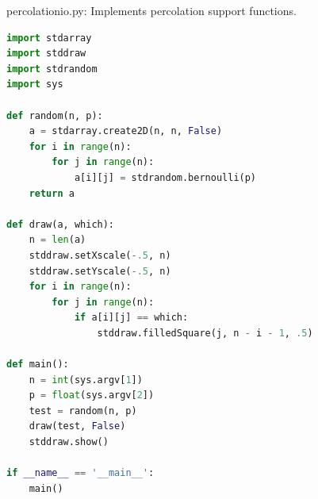 \documentclass[8pt,a4paper,compress,handout]{beamer}
\begin{document}
\begin{frame}[fragile]
\begin{framed}
\tiny percolationio.py: Implements percolation support functions.
\end{framed}

\begin{lstlisting}[language=Python]
import stdarray
import stddraw
import stdrandom
import sys

def random(n, p):
    a = stdarray.create2D(n, n, False)
    for i in range(n):
        for j in range(n):
            a[i][j] = stdrandom.bernoulli(p)
    return a

def draw(a, which):
    n = len(a)
    stddraw.setXscale(-.5, n)
    stddraw.setYscale(-.5, n)
    for i in range(n):
        for j in range(n):
            if a[i][j] == which:
                stddraw.filledSquare(j, n - i - 1, .5)

def main():
    n = int(sys.argv[1])
    p = float(sys.argv[2])
    test = random(n, p)
    draw(test, False)
    stddraw.show()
    
if __name__ == '__main__':
    main()
\end{lstlisting}
\end{frame}
\end{document}
